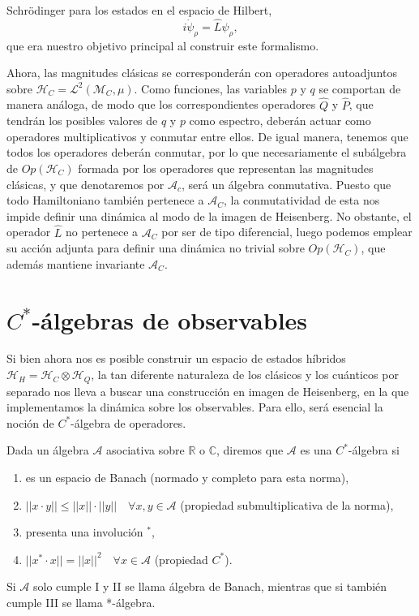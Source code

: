 \documentclass[openany, 11pt]{book}
\numberwithin{equation}{chapter}
\newcommand{\Hc}{\mathcal H_C}
\newcommand{\Hq}{\mathcal H_Q}
\newcommand{\Hh}{\mathcal H_H}
\newcommand{\Ac}{\mathcal A_C}
\newcommand{\Mc}{\mathcal M_C}
\newcommand{\Qop}{\hat Q}
\newcommand{\Pop}{\hat P}
\begin{document}
Schrödinger para los estados en el espacio de Hilbert, \begin{equation}
    i\dot\psi_\rho = \hat L\psi_\rho,
\end{equation}que era nuestro objetivo principal al construir este formalismo.

Ahora, las magnitudes clásicas se corresponderán con operadores autoadjuntos sobre $\Hc=\mathcal L^2(\Mc, \mu)$. Como funciones, las variables $p$ y $q$ se comportan de manera análoga, de modo que los correspondientes operadores $\Qop$ y $\Pop$, que tendrán los posibles valores de $q$ y $p$ como espectro, 
deberán actuar como operadores multiplicativos y conmutar entre ellos. De igual manera, tenemos que todos los operadores deberán conmutar, por lo que necesariamente el subálgebra de $Op(\Hc)$ formada por los operadores que representan las magnitudes clásicas, y que denotaremos por $\mathcal A_c$, será un álgebra 
conmutativa. Puesto que todo Hamiltoniano también pertenece a $\Ac$, la conmutatividad de esta nos impide definir una dinámica al modo de la imagen de Heisenberg. No obstante, el operador $\hat L$ no pertenece a $\Ac$ por ser de tipo diferencial, luego podemos emplear su acción adjunta para definir una dinámica no 
trivial sobre $Op(\Hc)$, que además mantiene invariante $\Ac$.

\section{$C^*$-álgebras de observables}

Si bien ahora nos es posible construir un espacio de estados híbridos $\Hh = \Hc \otimes \Hq$, la tan diferente naturaleza de los clásicos y los cuánticos por separado nos lleva a buscar una construcción en imagen de Heisenberg, en la que implementamos la dinámica sobre los observables. Para ello, será esencial la 
noción de $C^*$-álgebra de operadores. 

\begin{definition}[$C^*$-álgebra]
    Dada un álgebra $\mathcal A$ asociativa sobre $\mathbb R$ o $\mathbb C$, diremos que $\mathcal A$ es una $C^*$-álgebra si \begin{enumerate}
        \item es un espacio de Banach (normado y completo para esta norma),
        \item $||x\cdot y|| \leq ||x||\cdot ||y|| \quad\forall x,y\in\mathcal A$ (propiedad submultiplicativa de la norma),
        \item presenta una involución $^*$,
        \item $||x^* \cdot x|| = ||x||^2 \quad \forall x\in\mathcal A$ (propiedad $C^*$).
    \end{enumerate}Si $\mathcal A$ solo cumple \textsc{I} y \textsc{II} se llama álgebra de Banach, mientras que si también cumple \textsc{III} se llama *-álgebra.
\end{definition}
\end{document}
